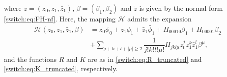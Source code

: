 where $z=(z_0,z_1,\bar{z}_1)$, $\beta=(\beta_1,\beta_2)$ and $\dot{z}$ is given by the normal form \cref{switch:eq:FH-nf}. Here, the mapping $\mathcal{H}$ admits the expansion
\begin{equation}
  \label{switch:eq:FH_H}
  \begin{aligned}
    \mathcal{H}(z_{0},z_{1},\bar{z}_{1},\beta) &= z_{0}\phi_{0}+z_{1}\phi_{1}+\bar{z}_{1}\bar{\phi}_{1} + H_{00010}\beta_1+H_{00001}\beta_2\\
    &+ \displaystyle \sum_{j+k+l+|\mu|\geq 2}\dfrac{1}{j!k!l!\mu!}H_{jkl\mu}z_{0}^{j}z_{1}^{k}\bar{z}_{1}^{l}\beta^{\mu},
  \end{aligned}
\end{equation}
and the functions $R$ and $K$ are as in \cref{switch:eq:R_truncated} and \cref{switch:eq:K_truncated}, respectively.

